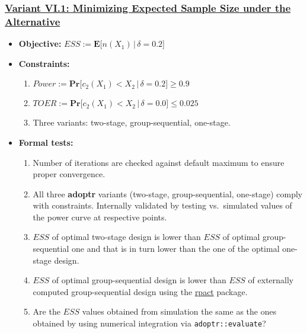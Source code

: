 \documentclass[
]{book}
\providecommand{\tightlist}{%
  \setlength{\itemsep}{0pt}\setlength{\parskip}{0pt}}
\begin{document}
\hypertarget{variant-vi.1-minimizing-expected-sample-size-under-the-alternative}{%
\subsubsection{\texorpdfstring{\protect\hyperlink{variantVI_1}{Variant VI.1: Minimizing Expected Sample Size under the Alternative}}{Variant VI.1: Minimizing Expected Sample Size under the Alternative}}\label{variant-vi.1-minimizing-expected-sample-size-under-the-alternative}}

\begin{itemize}
\tightlist
\item
  \textbf{Objective:} \(ESS := \boldsymbol{E}\big[n(X_1)\,|\,\delta=0.2\big]\)
\item
  \textbf{Constraints:}

  \begin{enumerate}
  \def\labelenumi{\arabic{enumi}.}
  \tightlist
  \item
    \(Power := \boldsymbol{Pr}\big[c_2(X_1) < X_2\,|\,\delta=0.2\big] \geq 0.9\)
  \item
    \(TOER := \boldsymbol{Pr}\big[c_2(X_1) < X_2\,|\,\delta=0.0\big] \leq 0.025\)
  \item
    Three variants: two-stage, group-sequential, one-stage.
  \end{enumerate}
\item
  \textbf{Formal tests:}

  \begin{enumerate}
  \def\labelenumi{\arabic{enumi}.}
  \tightlist
  \item
    Number of iterations are checked against default maximum to ensure proper
    convergence.
  \item
    All three \textbf{adoptr} variants (two-stage, group-sequential, one-stage)
    comply with constraints. Internally validated by testing vs.~simulated
    values of the power curve at respective points.
  \item
    \(ESS\) of optimal two-stage design is lower than \(ESS\) of optimal
    group-sequential one and that is in turn lower than the one of the
    optimal one-stage design.
  \item
    \(ESS\) of optimal group-sequential design is lower than \(ESS\) of
    externally computed group-sequential design using the \href{https://rpact.org/}{rpact} package.
  \item
    Are the \(ESS\) values obtained from simulation the same as the ones
    obtained by using numerical integration via \texttt{adoptr::evaluate}?
  \end{enumerate}
\end{itemize}
\end{document}
